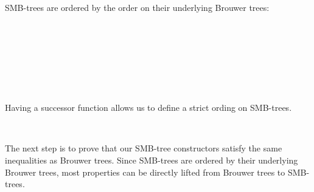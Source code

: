 SMB-trees are ordered by the order on their underlying Brouwer trees:
%
\begin{code}%
\>[0]\AgdaSpace{}%
\AgdaSpace{}%
\AgdaSymbol{(}\AgdaSpace{}%
\AgdaSpace{}%
\AgdaSymbol{:}\AgdaSpace{}%
\AgdaSymbol{)}\AgdaSpace{}%
\AgdaSymbol{:}\AgdaSpace{}%
\AgdaSpace{}%
\AgdaSpace{}%
\<%
\\
\>[0][@{}l@{\AgdaIndent{0}}]%
\>[2]\AgdaSpace{}%
\<%
\\
%
\>[2]\<%
\\
%
\>[2]\<%
\\
\>[2][@{}l@{\AgdaIndent{0}}]%
\>[4]\AgdaSpace{}%
\AgdaSymbol{:}\AgdaSpace{}%
\AgdaSymbol{(}\AgdaSpace{}%
\AgdaSymbol{)}\AgdaSpace{}%
\AgdaSpace{}%
\AgdaSymbol{(}\AgdaSpace{}%
\AgdaSymbol{)}\<%
\\
\>[0]\AgdaSpace{}%
\<%
\\
\>[0]\<%
\end{code}
%
Having a successor function allows us to define a strict ording on SMB-trees.
\begin{code}%
\>[0]\AgdaOperator{\AgdaFunction{\AgdaUnderscore{}<\AgdaUnderscore{}}}\AgdaSpace{}%
\AgdaSymbol{:}\AgdaSpace{}%
\AgdaSpace{}%
\AgdaSpace{}%
\AgdaSpace{}%
\AgdaSpace{}%
\AgdaSpace{}%
\<%
\\
\>[0]\AgdaOperator{\AgdaFunction{\AgdaUnderscore{}<\AgdaUnderscore{}}}\AgdaSpace{}%
\AgdaSpace{}%
\AgdaSpace{}%
\AgdaSymbol{=}\AgdaSpace{}%
\AgdaSymbol{(}\AgdaSpace{}%
\AgdaSymbol{)}\AgdaSpace{}%
\AgdaSpace{}%
\<%
\end{code}

The next step is to prove that our SMB-tree constructors satisfy the same
inequalities as Brouwer trees. Since SMB-trees are ordered by their underlying
Brouwer trees, most properties can be directly lifted from  Brouwer trees
to SMB-trees.

